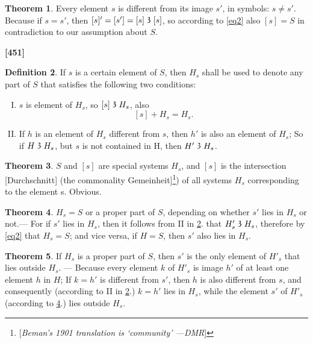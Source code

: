 \documentclass[leqno]{article}
\theoremstyle{definition}
\newtheorem{theorem}{Theorem}
\newtheorem{definition}[theorem]{Definition}
\newcommand\partof{\mathrel{\raisebox{0.45ex}{$\mathfrak{3}$}}}
\begin{document}
\begin{theorem}\label{thm2}
Every element $s$ is different from its image $s'$, in symbols: $s \neq s'$. 
Because if $s = s'$, then $[s]' = [s'] = [s] \partof [s]$, so according to \eqref{eq2} also $[s] = S$ in contradiction to our assumption about $S$.
\end{theorem}

\textbf{[451]}


\begin{definition}\label{def3}
If $s$ is a certain element of $S$, then $H_s$ shall be used to denote any part of $S$ that satisfies the following two conditions:
\begin{enumerate}[I.]
\item $s$ is element of $H_s$, so $[s] \partof H_s$, also 
\[
	[s] + H_s = H_s.
\]
\item If $h$ is an element of $H_s$ different from $s$, then $h'$ is also an element of $H_s$; So if $H \partof H_s$, but $s$ is not contained in H, then $H' \partof H_s$.
\end{enumerate}
\end{definition}

 \begin{theorem}\label{thm4}
 $S$ and $[s]$ are special systems $H_s$, and $[s]$ is the intersection [Durchschnitt] (the commonality Gemeinheit]\footnote{[\emph{Beman's 1901 translation is `community' ---DMR}]}) of all systems $H_s$ corresponding to the element s. Obvious.\end{theorem}

\begin{theorem}\label{thm5}
$H_s = S$ or a proper part of $S$, depending on whether $s'$ lies in $H_s$ or not.--- For if $s'$ lies in $H_s$, then it follows from II in \ref{def3}. that $H'_s \partof H_s$, therefore by \eqref{eq2} that $H_s = S$; and vice versa, if $H = S$, then $s'$ also lies in $H_s$.\end{theorem}



\begin{theorem}\label{thm6}
 If $H_s$ is a proper part of $S$, then $s'$ is the only element of $H'_s$ that lies outside $H_s$.
--- Because every element $k$ of $H'_s$ is image $h'$ of at least one element $h$ in $H$; 
If $k=h'$ is different from $s'$, then $h$ is also different from $s$, and consequently (according to II in \ref{def3}.) $k = h'$ lies in $H_s$, while the element $s'$ of $H'_s$ (according to \ref{thm5}.) lies outside $H_s$.
\end{theorem}
\end{document}
